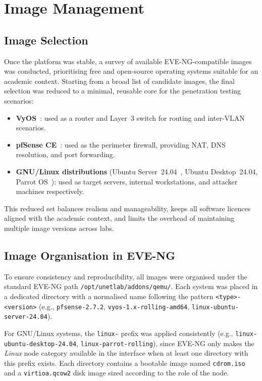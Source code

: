 \section{Image Management}

\subsection{Image Selection}

Once the platform was stable, a survey of available EVE-NG-compatible images was
conducted, prioritising free and open-source operating systems suitable for an
academic context. Starting from a broad list of candidate images, the final selection
was reduced to a minimal, reusable core for the penetration testing scenarios:

\begin{itemize}
    \item \textbf{VyOS}~\cite{vyos}: used as a router and Layer~3 switch for routing and
          inter-VLAN scenarios.
    \item \textbf{pfSense CE}~\cite{pfsense}: used as the perimeter firewall, providing NAT,
          DNS resolution, and port forwarding.
    \item \textbf{GNU/Linux distributions} (Ubuntu Server~24.04~\cite{ubuntu}, Ubuntu
          Desktop~24.04, Parrot OS~\cite{parrot_os}): used as target servers, internal workstations,
          and attacker machines respectively.
\end{itemize}

This reduced set balances realism and manageability, keeps all software licences
aligned with the academic context, and limits the overhead of maintaining multiple
image versions across labs.

\subsection{Image Organisation in EVE-NG}

To ensure consistency and reproducibility, all images were organised under the
standard EVE-NG path \texttt{/opt/unetlab/addons/qemu/}. Each system was placed in
a dedicated directory with a normalised name following the pattern
\texttt{<type>-<version>} (e.g., \texttt{pfsense-2.7.2},
\texttt{vyos-1.x-rolling-amd64}, \texttt{linux-ubuntu-server-24.04}).

For GNU/Linux systems, the \texttt{linux-} prefix was applied consistently
(e.g., \texttt{linux-ubuntu-desktop-24.04}, \texttt{linux-parrot-rolling}), since
EVE-NG only makes the \textit{Linux} node category available in the interface when
at least one directory with this prefix exists. Each directory contains a bootable
image named \texttt{cdrom.iso} and a \texttt{virtioa.qcow2} disk image sized
according to the role of the node.

